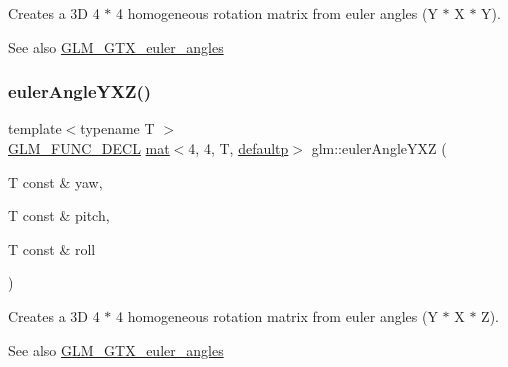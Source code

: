 Creates a 3D 4 $\ast$ 4 homogeneous rotation matrix from euler angles (Y $\ast$ X $\ast$ Y). \begin{DoxySeeAlso}{See also}
\mbox{\hyperlink{group__gtx__euler__angles}{G\+L\+M\+\_\+\+G\+T\+X\+\_\+euler\+\_\+angles}} 
\end{DoxySeeAlso}
\mbox{\label{group__gtx__euler__angles_gab8ba99a9814f6d9edf417b6c6d5b0c10}} 
\subsubsection{\texorpdfstring{euler\+Angle\+Y\+X\+Z()}{eulerAngleYXZ()}}
{\footnotesize\ttfamily template$<$typename T $>$ \\
\mbox{\hyperlink{setup_8hpp_ab2d052de21a70539923e9bcbf6e83a51}{G\+L\+M\+\_\+\+F\+U\+N\+C\+\_\+\+D\+E\+CL}} \mbox{\hyperlink{structglm_1_1mat}{mat}}$<$4, 4, T, \mbox{\hyperlink{namespaceglm_a36ed105b07c7746804d7fdc7cc90ff25a9d21ccd8b5a009ec7eb7677befc3bf51}{defaultp}}$>$ glm\+::euler\+Angle\+Y\+XZ (\begin{DoxyParamCaption}\item[{T const \&}]{yaw,  }\item[{T const \&}]{pitch,  }\item[{T const \&}]{roll }\end{DoxyParamCaption})}

Creates a 3D 4 $\ast$ 4 homogeneous rotation matrix from euler angles (Y $\ast$ X $\ast$ Z). \begin{DoxySeeAlso}{See also}
\mbox{\hyperlink{group__gtx__euler__angles}{G\+L\+M\+\_\+\+G\+T\+X\+\_\+euler\+\_\+angles}} 
\end{DoxySeeAlso}
\mbox{\label{group__gtx__euler__angles_ga220379e10ac8cca55e275f0c9018fed9}} 
